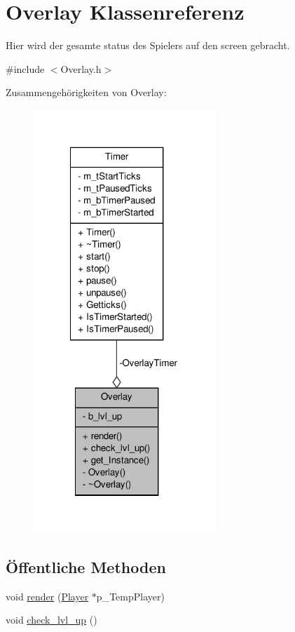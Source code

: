 \hypertarget{class_overlay}{\section{Overlay Klassenreferenz}
\label{class_overlay}
}


Hier wird der gesamte status des Spielers auf den screen gebracht.  




{\ttfamily \#include $<$Overlay.\-h$>$}



Zusammengehörigkeiten von Overlay\-:
\nopagebreak
\begin{figure}[H]
\begin{center}
\leavevmode
\includegraphics[width=194pt]{class_overlay__coll__graph}
\end{center}
\end{figure}
\subsection*{Öffentliche Methoden}
\begin{DoxyCompactItemize}
\item 
void \hyperlink{class_overlay_ab5e47eefa2743c08bc208131c8b17a45}{render} (\hyperlink{class_player}{Player} $\ast$p\-\_\-\-Temp\-Player)
\item 
void \hyperlink{class_overlay_a6e01bd776bf1daf819ced8e0e45b4478}{check\-\_\-lvl\-\_\-up} ()
\end{DoxyCompactItemize}
